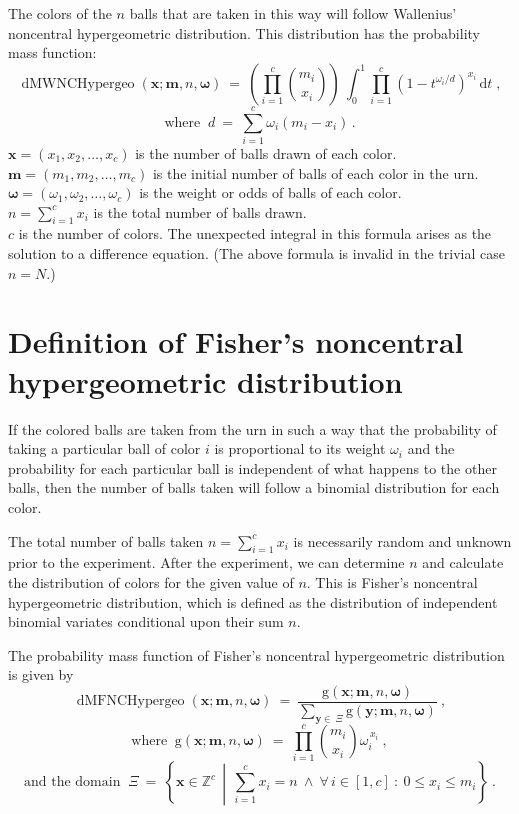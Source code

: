\documentclass[a4paper]{article}
\begin{document}
The colors of the $n$ balls that are taken in this way will follow Wallenius'
noncentral hypergeometric distribution. This distribution has the 
probability mass function:
%
$$
\operatorname{dMWNCHypergeo}(\boldsymbol{x};\boldsymbol{m},n,\boldsymbol{\omega}) 
\:=\: 
\left( \prod_{i=1}^c \binom{m_i}{x_i} \right)
\: \int_0^1 \prod_{i=1}^c
(1-t^{{\omega_i}/{d}})^{x_i} \, \mathrm{d}t \;,
$$
%
$$
\text{where } \: d \:=\:
\sum_{i=1}^c \omega_i(m_i-x_i) \,.
$$
%
$\boldsymbol{x}=(x_1,x_2,\ldots,x_c)$ 
is the number of balls drawn of each color.\\
$\boldsymbol{m}=(m_1,m_2,\ldots,m_c)$ 
is the initial number of balls of each color in the urn.\\
$\boldsymbol{\omega}=(\omega_1,\omega_2,\ldots,\omega_c)$
is the weight or odds of balls of each color.\\
$n = \sum_{i=1}^c x_i$ is the total number of balls drawn.\\
$c$ is the number of colors. The unexpected integral in this 
formula arises as the solution to a difference equation.
(The above formula is invalid in the trivial case $n = N$.)


\section{Definition of Fisher's noncentral hypergeometric distribution}
%
If the colored balls are taken from the urn in such a way that 
the probability of taking a particular ball of color $i$ is 
proportional to its weight $\omega_i$ and the probability for
each particular ball is independent of what happens to the 
other balls, then the number of balls taken will follow a
binomial distribution for each color.

The total number of balls taken $n = \sum_{i=1}^c x_i$ is
necessarily random and unknown prior to the experiment.
After the experiment, we can determine $n$ and calculate the
distribution of colors for the given value of $n$.
This is Fisher's noncentral hypergeometric distribution, which
is defined as the distribution of independent binomial variates
conditional upon their sum $n$.

The probability mass function of Fisher's noncentral hypergeometric 
distribution is given by
%
$$
\operatorname{dMFNCHypergeo}(\boldsymbol{x};\boldsymbol{m},n,\boldsymbol{\omega})
\:=\:
\frac{\textrm{g}(\boldsymbol{x};\boldsymbol{m},n,\boldsymbol{\omega})}
{\sum\limits_{\boldsymbol{y}\in \: \Xi}
\textrm{g}(\boldsymbol{y};\boldsymbol{m},n,\boldsymbol{\omega})}\:,
$$
%
$$
\text{where } \: \textrm{g}(\boldsymbol{x};\boldsymbol{m},n,\boldsymbol{\omega})
\:=\: \prod_{i=1}^c
\binom{m_i}{x_i}\omega_i^{\,x_i}\:,
$$
%
$$
\text{and the domain }\: \Xi \:=\: \left\{\boldsymbol{x}\in\mathbb{Z}^c \,\middle|\,
\sum_{i=1}^c x_i = n \: \wedge \: 
\forall\, i \in [1,c] \: : \: 0 \leq x_i \leq m_i \right\}\:.
$$
\end{document}
